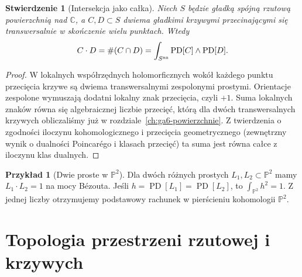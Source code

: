 \documentclass[11pt,a4paper,openany]{report}
\numberwithin{equation}{section}
\theoremstyle{plain}
\newtheorem{stwierdzenie}[twierdzenie]{Stwierdzenie}
\theoremstyle{definition}
\newtheorem{przyklad}[twierdzenie]{Przykład}
\theoremstyle{remark}
\newcommand{\C}{\mathbb C}
\newcommand{\PP}{\mathbb P}
\begin{document}
\begin{stwierdzenie}[Intersekcja jako całka]
\label{st:ga10-intersection}
Niech $S$ będzie gładką spójną rzutową powierzchnią nad $\C$,
a $C,D\subset S$ dwiema gładkimi krzywymi przecinającymi się
transwersalnie w skończenie wielu punktach. Wtedy
\[
 C\cdot D=\#(C\cap D)
 =\int_{S^{\rm an}}\operatorname{PD}[C]\wedge\operatorname{PD}[D].
\]
\end{stwierdzenie}
\begin{proof}
W lokalnych współrzędnych holomorficznych wokół każdego
punktu przecięcia krzywe są dwiema transwersalnymi
zespolonymi prostymi. Orientacje zespolone wymuszają dodatni
lokalny znak przecięcia, czyli $+1$. Suma lokalnych znaków
równa się algebraicznej liczbie przecięć, którą dla dwóch
transwersalnych krzywych obliczaliśmy już w
rozdziale~\ref{ch:ga6-powierzchnie}. Z twierdzenia o zgodności
iloczynu kohomologicznego i przecięcia geometrycznego
(zewnętrzny wynik o dualności Poincarégo i klasach przecięć) ta suma jest
równa całce z iloczynu klas dualnych.
\end{proof}

\begin{przyklad}[Dwie proste w $\PP^2$]
Dla dwóch różnych prostych $L_1,L_2\subset\PP^2$ mamy
$L_1\cdot L_2=1$ na mocy Bézouta. Jeśli
$h=\operatorname{PD}[L_1]=\operatorname{PD}[L_2]$,
to $\int_{\PP^2}h^2=1$. Z jednej liczby otrzymujemy
podstawowy rachunek w pierścieniu kohomologii $\PP^2$.
\end{przyklad}

\section{Topologia przestrzeni rzutowej i krzywych}
\label{sec:ga10-projektywne}
\end{document}
